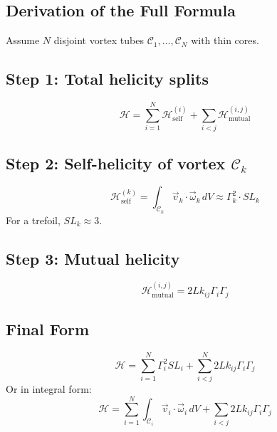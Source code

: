     \subsection{ Derivation of the Full Formula}
    Assume $N$ disjoint vortex tubes $\mathcal{C}_1, \dots, \mathcal{C}_N$ with thin cores.

    \subsection*{Step 1: Total helicity splits}
    \begin{equation}
        \mathcal{H} = \sum_{i=1}^N \mathcal{H}_{\text{self}}^{(i)} + \sum_{i < j} \mathcal{H}_{\text{mutual}}^{(i,j)}
    \end{equation}

    \subsection*{Step 2: Self-helicity of vortex $\mathcal{C}_k$}
    \begin{equation}
        \mathcal{H}_{\text{self}}^{(k)} = \int_{\mathcal{C}_k} \vec{v}_k \cdot \vec{\omega}_k \, dV \approx \Gamma_k^2 \cdot SL_k
    \end{equation}
    For a trefoil, $SL_k \approx 3$.

    \subsection*{Step 3: Mutual helicity}
    \begin{equation}
        \mathcal{H}_{\text{mutual}}^{(i,j)} = 2 Lk_{ij} \Gamma_i \Gamma_j
    \end{equation}

    \subsection*{Final Form}
    \begin{equation}
        \boxed{
            \mathcal{H} = \sum_{i=1}^{N} \Gamma_i^2 SL_i + \sum_{i < j}^{N} 2 Lk_{ij} \Gamma_i \Gamma_j
        }
    \end{equation}
    Or in integral form:
    \begin{equation}
        \boxed{
            \mathcal{H} = \sum_{i=1}^{N} \int_{\mathcal{C}_i} \vec{v}_i \cdot \vec{\omega}_i \, dV + \sum_{i < j} 2 Lk_{ij} \Gamma_i \Gamma_j
        }
    \end{equation}

